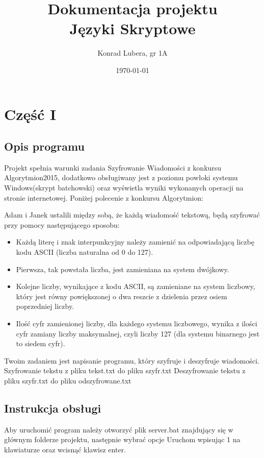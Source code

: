 \documentclass[12pt,a4paper]{article}
\begin{document}
	
	\title{Dokumentacja projektu\\ Języki Skryptowe}
	\author{Konrad Lubera, gr 1A}
	\date{\today}
	
	\maketitle
	\newpage
	\section*{Część I}
	\subsection*{Opis programu}
	 Projekt spełnia warunki zadania Szyfrowanie Wiadomości z konkursu Algorytmion2015, dodatkowo obsługiwany jest z poziomu powłoki systemu Windows(skrypt batchowski) oraz wyświetla wyniki wykonanych operacji na stronie internetowej. 
	 \newline
	\newline Poniżej polecenie z konkursu Algorytmion:
	
	Adam i Janek ustalili między sobą, że każdą wiadomość tekstową, będą szyfrować przy pomocy następującego sposobu:
	\begin{itemize}
	\item   Każdą literę i znak interpunkcyjny należy zamienić na odpowiadającą liczbę kodu ASCII (liczba naturalna od 0 do 127).
	\item Pierwsza, tak powstała liczba, jest zamieniana na system dwójkowy.
	\item Kolejne liczby, wynikające z kodu ASCII, są zamieniane na system liczbowy, który jest równy powiększonej o dwa reszcie z dzielenia przez osiem poprzedniej liczby.
	\item  Ilość cyfr zamienionej liczby, dla każdego systemu liczbowego, wynika z ilości cyfr zamiany liczby maksymalnej, czyli liczby 127 (dla systemu binarnego jest to siedem cyfr). 
	\end{itemize}
	Twoim zadaniem jest napisanie programu, który szyfruje i deszyfruje wiadomości. \newline
Szyfrowanie tekstu z pliku tekst.txt do pliku szyfr.txt \newline Deszyfrowanie tekstu z pliku szyfr.txt do pliku odszyfrowane.txt 

	\subsection*{Instrukcja obsługi}
	Aby uruchomić program należy otworzyć plik server.bat znajdujący się w głównym folderze projektu, następnie wybrać opcje Uruchom wpisując 1 na klawiaturze oraz wcisnąć klawisz enter.
	
\end{document}
